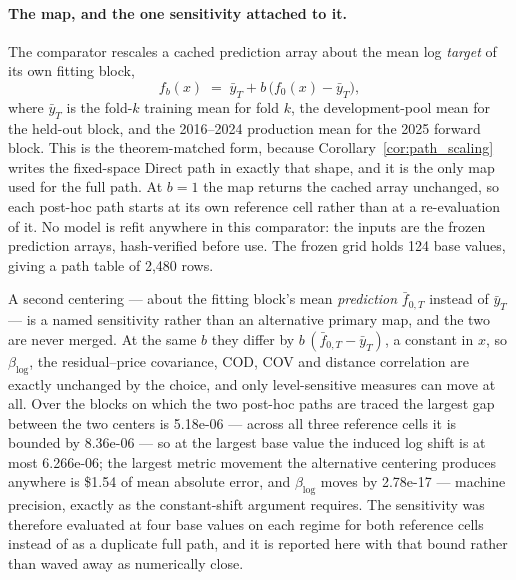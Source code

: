 \documentclass[10pt]{article}
\theoremstyle{definition}
\newcommand{\1}{\mathbf{1}}
\begin{document}
\paragraph{The map, and the one sensitivity attached to it.}
The comparator rescales a cached prediction array about the mean log \emph{target} of
its own fitting block,
\[
  f_b(x) \;=\; \bar y_T + b\,\bigl(f_0(x)-\bar y_T\bigr),
\]
where $\bar y_T$ is the fold-$k$ training mean for fold $k$, the development-pool mean for the
held-out block, and the 2016--2024 production mean for the 2025 forward block. This is the
theorem-matched form, because Corollary~\ref{cor:path_scaling} writes the fixed-space Direct path in
exactly that shape, and it is the only map used for the full path. At $b=1$ the map returns the
cached array unchanged, so each post-hoc path starts at its own reference cell rather than at a
re-evaluation of it. No model is refit anywhere in this comparator: the inputs are the frozen
prediction arrays, hash-verified before use. The frozen grid holds 124 base values, giving a
path table of 2,480 rows.

A second centering --- about the fitting block's mean \emph{prediction}
$\bar f_{0,T}$ instead of $\bar y_T$ --- is a named sensitivity rather than an alternative primary
map, and the two are never merged. At the same $b$ they differ by $b\,(\bar f_{0,T}-\bar y_T)$, a
constant in $x$, so $\beta_{\log}$, the residual--price covariance, COD, COV and distance
correlation are exactly unchanged by the choice, and only level-sensitive measures can move at all.
Over the blocks on which the two post-hoc paths are traced the largest gap between the two centers
is 5.18e-06 --- across all three reference cells it is bounded by 8.36e-06 --- so at the largest
base value the induced log shift is at most 6.266e-06; the largest metric movement the alternative
centering produces anywhere is \$1.54{} of mean absolute error, and $\beta_{\log}$ moves
by 2.78e-17 --- machine precision, exactly as the constant-shift argument requires. The
sensitivity was therefore evaluated at four base values on each regime for both reference cells
instead of as a duplicate full path, and it is reported here with that bound rather than waved away
as numerically close.
\end{document}
